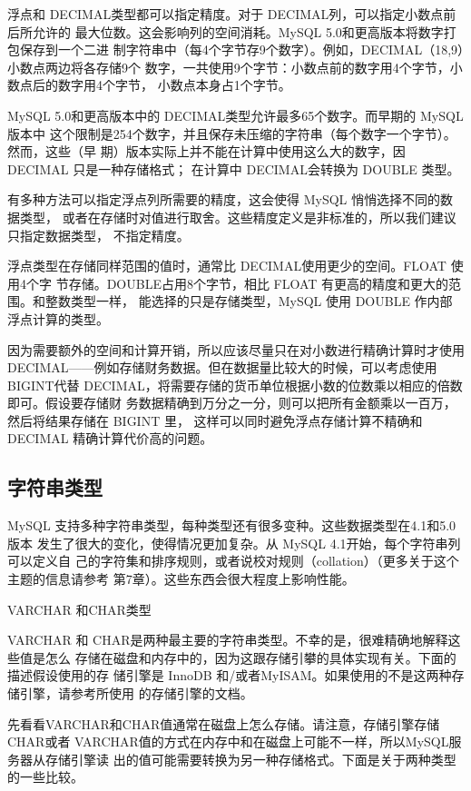 浮点和 DECIMAL类型都可以指定精度。对于 DECIMAL列，可以指定小数点前后所允许的
最大位数。这会影响列的空间消耗。MySQL 5.0和更高版本将数字打包保存到一个二进
制字符串中（每4个字节存9个数字）。例如，DECIMAL（18,9）小数点两边将各存储9个
数字，一共使用9个字节：小数点前的数字用4个字节，小数点后的数字用4个字节，
小数点本身占1个字节。

MySQL 5.0和更高版本中的 DECIMAL类型允许最多65个数字。而早期的 MySQL版本中
这个限制是254个数字，并且保存未压缩的字符串（每个数字一个字节）。然而，这些（早
期）版本实际上并不能在计算中使用这么大的数字，因 DECIMAL 只是一种存储格式；
在计算中 DECIMAL会转换为 DOUBLE 类型。

有多种方法可以指定浮点列所需要的精度，这会使得 MySQL 悄悄选择不同的数据类型，
或者在存储时对值进行取舍。这些精度定义是非标准的，所以我们建议只指定数据类型，
不指定精度。

浮点类型在存储同样范围的值时，通常比 DECIMAL使用更少的空间。FLOAT 使用4个字
节存储。DOUBLE占用8个字节，相比 FLOAT 有更高的精度和更大的范围。和整数类型一样，
能选择的只是存储类型，MySQL 使用 DOUBLE 作内部浮点计算的类型。

因为需要额外的空间和计算开销，所以应该尽量只在对小数进行精确计算时才使用
DECIMAL——例如存储财务数据。但在数据量比较大的时候，可以考虑使用 BIGINT代替
DECIMAL，将需要存储的货币单位根据小数的位数乘以相应的倍数即可。假设要存储财
务数据精确到万分之一分，则可以把所有金额乘以一百万，然后将结果存储在 BIGINT 里，
这样可以同时避免浮点存储计算不精确和 DECIMAL 精确计算代价高的问题。

\subsection{字符串类型}
MySQL 支持多种字符串类型，每种类型还有很多变种。这些数据类型在4.1和5.0版本
发生了很大的变化，使得情况更加复杂。从 MySQL 4.1开始，每个字符串列可以定义自
己的字符集和排序规则，或者说校对规则（collation）（更多关于这个主题的信息请参考
第7章）。这些东西会很大程度上影响性能。

VARCHAR 和CHAR类型

VARCHAR 和 CHAR是两种最主要的字符串类型。不幸的是，很难精确地解释这些值是怎么
存储在磁盘和内存中的，因为这跟存储引攀的具体实现有关。下面的描述假设使用的存
储引擎是 InnoDB 和/或者MyISAM。如果使用的不是这两种存储引擎，请参考所使用
的存储引擎的文档。

先看看VARCHAR和CHAR值通常在磁盘上怎么存储。请注意，存储引擎存储CHAR或者
VARCHAR值的方式在内存中和在磁盘上可能不一样，所以MySQL服务器从存储引擎读
出的值可能需要转换为另一种存储格式。下面是关于两种类型的一些比较。

